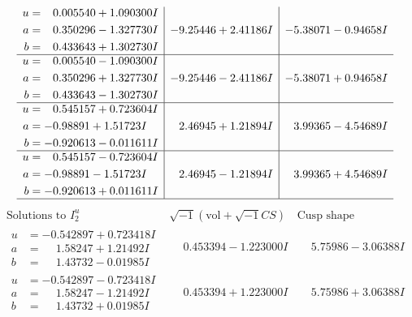 \documentclass[1p]{elsarticle_modified}
\theoremstyle{definition}
\newcommand{\I}{\sqrt{-1}}
\begin{document}
$$\begin{array}{c|c|c}
\begin{aligned}
u &= \phantom{-}0.005540 + 1.090300 I \\
a &= \phantom{-}0.350296 - 1.327730 I \\
b &= \phantom{-}0.433643 + 1.302730 I\end{aligned}
 & -9.25446 + 2.41186 I & -5.38071 - 0.94658 I \\ \hline\begin{aligned}
u &= \phantom{-}0.005540 - 1.090300 I \\
a &= \phantom{-}0.350296 + 1.327730 I \\
b &= \phantom{-}0.433643 - 1.302730 I\end{aligned}
 & -9.25446 - 2.41186 I & -5.38071 + 0.94658 I \\ \hline\begin{aligned}
u &= \phantom{-}0.545157 + 0.723604 I \\
a &= -0.98891 + 1.51723 I \\
b &= -0.920613 - 0.011611 I\end{aligned}
 & \phantom{-}2.46945 + 1.21894 I & \phantom{-}3.99365 - 4.54689 I \\ \hline\begin{aligned}
u &= \phantom{-}0.545157 - 0.723604 I \\
a &= -0.98891 - 1.51723 I \\
b &= -0.920613 + 0.011611 I\end{aligned}
 & \phantom{-}2.46945 - 1.21894 I & \phantom{-}3.99365 + 4.54689 I\\
 \hline 
 \end{array}$$\newpage$$\begin{array}{c|c|c}  
\text{Solutions to }I^u_{2}& \I (\text{vol} + \sqrt{-1}CS) & \text{Cusp shape}\\
 \hline 
\begin{aligned}
u &= -0.542897 + 0.723418 I \\
a &= \phantom{-}1.58247 + 1.21492 I \\
b &= \phantom{-}1.43732 - 0.01985 I\end{aligned}
 & \phantom{-}0.453394 - 1.223000 I & \phantom{-}5.75986 - 3.06388 I \\ \hline\begin{aligned}
u &= -0.542897 - 0.723418 I \\
a &= \phantom{-}1.58247 - 1.21492 I \\
b &= \phantom{-}1.43732 + 0.01985 I\end{aligned}
 & \phantom{-}0.453394 + 1.223000 I & \phantom{-}5.75986 + 3.06388 I \\ \hline\begin{aligned}

\end{aligned}
\end{array}$$
\end{document}
